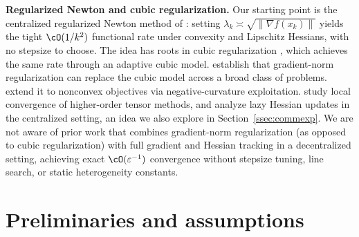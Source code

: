 \documentclass[review,onefignum,onetabnum]{siamart171218}
\begin{document}
	\noindent\textbf{Regularized Newton and cubic regularization.}
	Our starting point is the centralized regularized Newton method of
	\citet{mishchenko2023rn}: setting
	$\lambda_k\asymp\sqrt{\|\nabla f(x_k)\|}$ yields the tight
	$\cO(1/k^2)$ functional rate under convexity and Lipschitz Hessians,
	with no stepsize to choose.
	The idea has roots in cubic regularization
	\citep{nesterov2006cubic,cartis2011arc}, which achieves the same rate
	through an adaptive cubic model.
	\citet{doikov2024gradient} establish that gradient-norm
	regularization can replace the cubic model across a broad class of
	problems.
	\citet{gratton2023nonconvex} extend it to nonconvex objectives via
	negative-curvature exploitation.
	\citet{doikov2022tensor} study local convergence of higher-order
	tensor methods, and \citet{doikov2023lazy} analyze lazy Hessian
	updates in the centralized setting, an idea we also explore in
	Section~\ref{ssec:commexp}.
	We are not aware of prior work that combines gradient-norm
	regularization (as opposed to cubic regularization) with full
	gradient and Hessian tracking in a decentralized setting,
	achieving exact $\cO(\varepsilon^{-1})$ convergence without
	stepsize tuning, line search, or static heterogeneity constants.
	
	\section{Preliminaries and assumptions}\label{sec:prelim}
\end{document}

